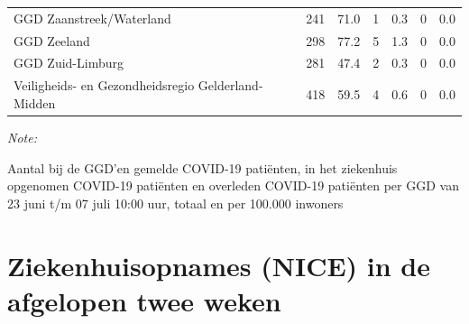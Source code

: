 \documentclass[
  english,
  man,floatsintext]{apa6}
\begin{document}
\begin{table}
\begin{threeparttable}
\begin{tabular}{lrrrrrr}
GGD Zaanstreek/Waterland & 241 & 71.0 & 1 & 0.3 & 0 & 0.0\\
GGD Zeeland & 298 & 77.2 & 5 & 1.3 & 0 & 0.0\\
GGD Zuid-Limburg & 281 & 47.4 & 2 & 0.3 & 0 & 0.0\\
Veiligheids- en Gezondheidsregio Gelderland-Midden & 418 & 59.5 & 4 & 0.6 & 0 & 0.0\\
\bottomrule
\end{tabular}
\begin{tablenotes}
\item \textit{Note: } 
\item Aantal bij de GGD’en gemelde COVID-19 patiënten, in het ziekenhuis opgenomen COVID-19 patiënten en overleden COVID-19 patiënten per GGD van 23 juni t/m 07 juli 10:00 uur, totaal en per 100.000 inwoners
\end{tablenotes}
\end{threeparttable}
\endgroup{}
\end{table}

\newpage

\hypertarget{ziekenhuisopnames-nice-in-de-afgelopen-twee-weken}{%
\section{Ziekenhuisopnames (NICE) in de afgelopen twee weken}\label{ziekenhuisopnames-nice-in-de-afgelopen-twee-weken}}
\end{document}
